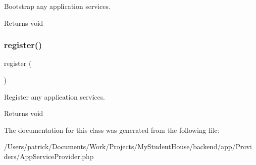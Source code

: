Bootstrap any application services.

\begin{DoxyReturn}{Returns}
void 
\end{DoxyReturn}
\mbox{\label{class_app_1_1_providers_1_1_app_service_provider_acc294a6cc8e69743746820e3d15e3f78}} 
\subsubsection{\texorpdfstring{register()}{register()}}
{\footnotesize\ttfamily register (\begin{DoxyParamCaption}{ }\end{DoxyParamCaption})}

Register any application services.

\begin{DoxyReturn}{Returns}
void 
\end{DoxyReturn}


The documentation for this class was generated from the following file\+:\begin{DoxyCompactItemize}
\item 
/\+Users/patrick/\+Documents/\+Work/\+Projects/\+My\+Student\+House/backend/app/\+Providers/App\+Service\+Provider.\+php\end{DoxyCompactItemize}
